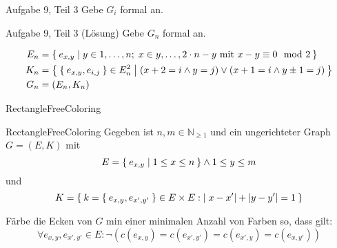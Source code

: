 \begin{frame}{Aufgabe 9, Teil 3}
Gebe $G_i$ formal an.

\begin{gallery}
\end{gallery}
\end{frame}

\begin{frame}{Aufgabe 9, Teil 3 (Lösung)}
Gebe $G_n$ formal an.

\begin{gallery}
\end{gallery}

\begin{align*}
    E_n &= \Set{e_{x,y} | y \in 1, \dots, n;\; x \in y, \dots, 2 \cdot n - y \text{ mit } x-y \equiv 0 \mod 2}\\
    K_n &= \Set{\Set{e_{x,y}, e_{i,j}} \in E_n^2 | (x+2=i \land y=j) \lor (x+1=i \land y\pm1=j)}\\
    G_n &= (E_n, K_n)
\end{align*}

\end{frame}

\begin{frame}{{\sc RectangleFreeColoring}}
    \begin{block}{{\sc RectangleFreeColoring}}
        Gegeben ist $n, m \in \mathbb{N}_{\geq 1}$ und ein 
        ungerichteter Graph $G = (E, K)$ mit 
            \[E = \Set{e_{x,y} | 1 \leq x \leq n} \land 1 \leq y \leq m\]
        und
            \[K = \Set{k=\Set{e_{x,y}, e_{x',y'}} \in E \times E : |x-x'| + |y-y'| = 1} \]
        
        Färbe die Ecken von $G$ min einer minimalen Anzahl von Farben so, dass gilt:
            \[\forall e_{x,y}, e_{x',y'} \in E: \neg(c(e_{x,y}) = c(e_{x',y'}) = c(e_{x',y}) = c(e_{x,y'}))\]
    \end{block}
\end{frame}

